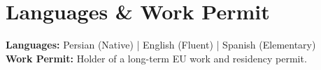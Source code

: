 \documentclass[11pt,a4paper]{article}
\begin{document}
\vspace{2mm}
\section{Languages \& Work Permit}
\textbf{Languages:} Persian (Native) | English (Fluent) | Spanish (Elementary) \\[2pt]
\textbf{Work Permit:} Holder of a long-term EU work and residency permit.

\end{document}
